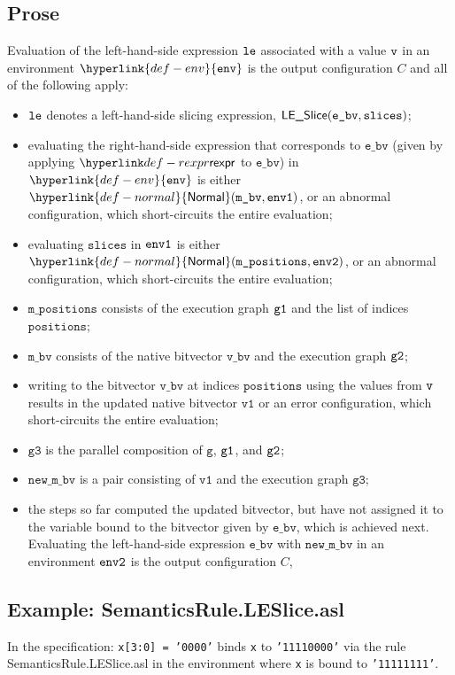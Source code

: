 \documentclass{book}
\newcommand\ProseOrAbnormal[0]{or an abnormal configuration, which short-circuits the entire evaluation}
\newcommand\ProseOrError[0]{or an error configuration, which short-circuits the entire evaluation}
\newcommand\Normal[0]{\hyperlink{def-normal}{\textsf{Normal}}}
\newcommand\env[0]{\hyperlink{def-env}{\texttt{env}}}
\newcommand\vg[0]{\texttt{g}}
\newcommand\vvone[0]{\texttt{v1}}
\newcommand\vgthree[0]{\texttt{g3}}
\newcommand\ebv[0]{\texttt{e\_bv}}
\newcommand\mbv[0]{\texttt{m\_bv}}
\newcommand\vbv[0]{\texttt{v\_bv}}
\newcommand\mpositions[0]{\texttt{m\_positions}}
\newcommand\slices[0]{\texttt{slices}}
\newcommand\positions[0]{\texttt{positions}}
\newcommand\newmbv[0]{\texttt{new\_m\_bv}}
\begin{document}
  \subsection{Prose}
  Evaluation of the left-hand-side expression $\texttt{le}$ associated with a
  value $\texttt{v}$ in an environment $\env$ is the output configuration $C$
  and all of the following apply:
  \begin{itemize}
    \item $\texttt{le}$ denotes a left-hand-side slicing expression, $\LESlice(\ebv, \slices)$;
    \item evaluating the right-hand-side expression that corresponds to $\ebv$
    (given by applying $\torexpr$ to $\ebv$) in $\env$
      is either $\Normal(\mbv,\envone)$, \ProseOrAbnormal;
    \item evaluating $\slices$ in $\texttt{env1}$ is either $\Normal(\mpositions, \envtwo)$,
    \ProseOrAbnormal;
    \item $\mpositions$ consists of the execution graph $\texttt{g1}$ and the list of indices $\positions$;
    \item $\mbv$ consists of the native bitvector $\vbv$ and the execution graph $\texttt{g2}$;
    \item writing to the bitvector $\vbv$ at indices $\positions$ using the values from $\texttt{v}$
    results in the updated native bitvector $\vvone$ \ProseOrError;
    \item $\vgthree$ is the parallel composition of $\vg$, $\texttt{g1}$, and $\texttt{g2}$;
    \item $\newmbv$ is a pair consisting of $\vvone$ and the execution graph $\vgthree$;
    \item the steps so far computed the updated bitvector, but have not assigned it to the
    variable bound to the bitvector given by $\ebv$, which is achieved next.
    Evaluating the left-hand-side expression $\ebv$ with
    $\newmbv$ in an environment $\texttt{env2}$ is the output configuration $C$,
  \end{itemize}

   \subsection{Example: SemanticsRule.LESlice.asl}
   In the specification:
   \texttt{x[3:0] = '0000'} binds \texttt{x} to \texttt{'11110000'}
   via the rule SemanticsRule.LESlice.asl
   in the environment where \texttt{x} is bound to \texttt{'11111111'}.
\end{document}
